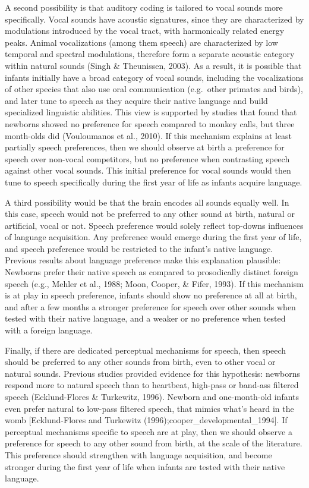 \documentclass[
  english,
  man]{apa6}
\begin{document}
A second possibility is that auditory coding is tailored to vocal sounds more specifically. Vocal sounds have acoustic signatures, since they are characterized by modulations introduced by the vocal tract, with harmonically related energy peaks. Animal vocalizations (among them speech) are characterized by low temporal and spectral modulations, therefore form a separate acoustic category within natural sounds (Singh \& Theunissen, 2003). As a result, it is possible that infants initially have a broad category of vocal sounds, including the vocalizations of other species that also use oral communication (e.g.~other primates and birds), and later tune to speech as they acquire their native language and build specialized linguistic abilities. This view is supported by studies that found that newborns showed no preference for speech compared to monkey calls, but three month-olds did (Vouloumanos et al., 2010). If this mechanism explains at least partially speech preferences, then we should observe at birth a preference for speech over non-vocal competitors, but no preference when contrasting speech against other vocal sounds. This initial preference for vocal sounds would then tune to speech specifically during the first year of life as infants acquire language.

A third possibility would be that the brain encodes all sounds equally well. In this case, speech would not be preferred to any other sound at birth, natural or artificial, vocal or not. Speech preference would solely reflect top-downs influences of language acquisition. Any preference would emerge during the first year of life, and speech preference would be restricted to the infant's native language. Previous results about language preference make this explanation plausible: Newborns prefer their native speech as compared to prosodically distinct foreign speech (e.g., Mehler et al., 1988; Moon, Cooper, \& Fifer, 1993). If this mechanism is at play in speech preference, infants should show no preference at all at birth, and after a few months a stronger preference for speech over other sounds when tested with their native language, and a weaker or no preference when tested with a foreign language.

Finally, if there are dedicated perceptual mechanisms for speech, then speech should be preferred to any other sounds from birth, even to other vocal or natural sounds. Previous studies provided evidence for this hypothesis: newborns respond more to natural speech than to heartbeat, high-pass or band-ass filtered speech (Ecklund-Flores \& Turkewitz, 1996). Newborn and one-month-old infants even prefer natural to low-pass filtered speech, that mimics what's heard in the womb {[}Ecklund-Flores and Turkewitz (1996);cooper\_developmental\_1994{]}. If perceptual mechanisms specific to speech are at play, then we should observe a preference for speech to any other sound from birth, at the scale of the literature. This preference should strengthen with language acquisition, and become stronger during the first year of life when infants are tested with their native language.
\end{document}
